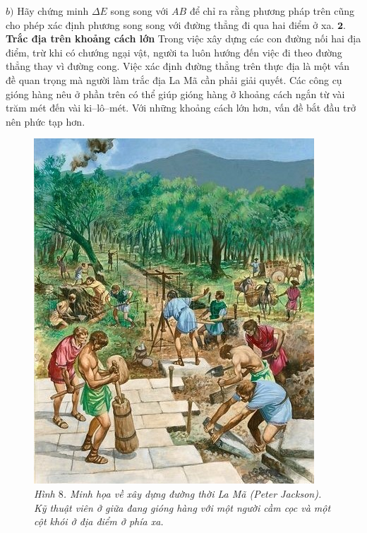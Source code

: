 \begin{multicols}{2}
\begin{figure}[H]
		\vspace*{-10pt}
	\end{figure}
	$b)$ Hãy chứng minh $\Delta E$ song song với $AB$ để chỉ ra rằng phương pháp trên cũng cho phép xác định phương song song với đường thẳng đi qua hai điểm ở xa.
	\vskip 0.1cm
	$\pmb{2.}$ \textbf{\color{toanhocdoisong}Trắc địa trên khoảng cách lớn}
	\vskip 0.1cm
	Trong việc xây dựng các con đường nối hai địa điểm, trừ khi có chướng ngại vật, người ta luôn hướng đến việc đi theo đường thẳng thay vì đường cong. Việc xác định đường thẳng trên thực địa là một vấn đề quan trọng mà người làm trắc địa La Mã cần phải giải quyết. Các công cụ gióng hàng nêu ở phần trên có thể giúp gióng hàng ở khoảng cách ngắn từ vài trăm mét đến vài ki--lô--mét. Với những khoảng cách lớn hơn, vấn đề bắt đầu trở nên phức tạp hơn.
	\begin{figure}[H]
		\vspace*{-5pt}
		\centering
		\captionsetup{labelformat= empty, justification=centering}
		\includegraphics[height= 0.8\linewidth]{8}
		\caption{\small\textit{\color{toanhocdoisong}Hình $8$. Minh họa về xây dựng đường thời La Mã (Peter Jackson). Kỹ thuật viên ở giữa đang gióng hàng với một người cầm cọc và một cột khói ở địa điểm ở phía xa.}}

\end{figure}
\end{multicols}
